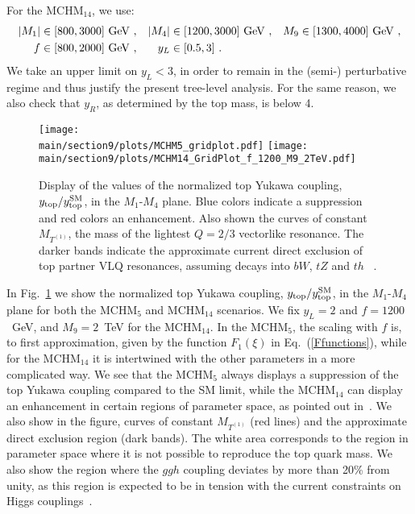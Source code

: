 For the MCHM$_{14}$, we use:
\begin{align*}
|M_1|& \in [800, 3000]~{\rm GeV}~, &  |M_4| &\in [1200, 3000]~{\rm GeV}~,  &  M_9 &\in [1300, 4000]~{\rm GeV}~,  \\
f&\in [800, 2000]~{\rm GeV}~,          &  y_L&\in [0.5, 3] ~.
\end{align*}
We take an upper limit on $y_L < 3$, in order to remain in the (semi-)
perturbative regime and thus justify the present tree-level analysis.
For the same reason, we also check that $y_R$, as determined by the
top mass, is below 4.
%
\begin{figure}[t]
\centering
\texttt{[image: \\main/section9/plots/MCHM5\_gridplot.pdf]}
\hspace{3mm}
\texttt{[image: \\main/section9/plots/MCHM14\_GridPlot\_f\_1200\_M9\_2TeV.pdf]}
\caption{Display of the values of the normalized top Yukawa coupling,
$y_{\rm top} / y_{\rm top}^{\rm SM}$, in the $M_1$-$M_4$ plane.  Blue
colors indicate a suppression and red colors an enhancement.  Also
shown the curves of constant $M_{T^{(1)}}$, the mass of the lightest $Q=2/3$
vectorlike resonance.  The darker bands indicate the approximate
current direct exclusion of top partner VLQ resonances, assuming decays into
$bW$, $tZ$ and $th$ ~\cite{Aaboud:2018pii, Sirunyan:2018omb}.}
\label{fig:ytvsM1M4}
\end{figure}
%
In Fig.~\ref{fig:ytvsM1M4} we show the normalized top Yukawa coupling,
$y_{\rm top} / y_{\rm top}^{\rm SM}$, in the $M_1$-$M_4$ plane for
both the MCHM$_5$ and MCHM$_{14}$ scenarios.  We fix $y_L = 2$ and $f
= 1200$~GeV, and $M_9 = 2$~TeV for the MCHM$_{14}$.  In the MCHM$_5$,
the scaling with $f$ is, to first approximation, given by the function
$F_1(\xi)$ in Eq.~(\ref{Ffunctions}), while for the MCHM$_{14}$ it is
intertwined with the other parameters in a more complicated way.  We
see that the MCHM$_5$ always displays a suppression of the top Yukawa
coupling compared to the SM limit, while the MCHM$_{14}$ can display
an enhancement in certain regions of parameter space, as pointed out
in~\cite{Liu:2017dsz}.  We also show in the figure, curves of constant
$M_{T^{(1)}}$ (red lines) and the approximate direct exclusion region
(dark bands).  The white area corresponds to the region in parameter
space where it is not possible to reproduce the top quark mass.  We
also show the region where the $ggh$ coupling deviates by more than
20\% from unity, as this region is expected to be in tension with the
current constraints on Higgs couplings~\cite{Khachatryan:2016vau}.
